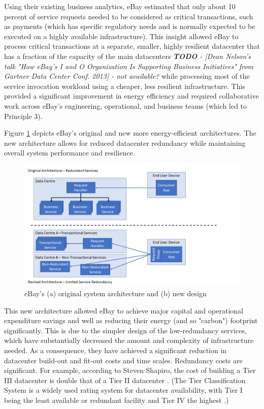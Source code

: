 Using their existing business analytics, eBay estimated that only about 10 percent of service requests needed to be considered as critical transactions, such as payments (which has specific regulatory needs and is normally expected to be executed on a highly available infrastructure). This insight allowed eBay to process critical transactions at a separate, smaller, highly resilient datacenter that has a fraction of the capacity of the main datacenters \emph{\textbf{TODO} - [Dean Nelson's talk "How eBay's I and O Organization Is Supporting Business Initiatives" from Gartner Data Center Conf. 2013] - not available?} while processing most of the service invocation workload using a cheaper, less resilient infrastructure. This provided a significant improvement in energy efficiency and required collaborative work across eBay's engineering, operational, and business teams (which led to Principle 3).

Figure \ref{figure:styles} depicts eBay's original and new more energy-efficient architectures. The new architecture allows for reduced datacenter redundancy while maintaining overall system performance and resilience.

\begin{figure}
\centering
\includegraphics[width=\textwidth]{Figures/principles-styles}
\caption{eBay's (a) original system architecture and (b) new design}
\label{figure:styles}
\end{figure}

This new architecture allowed eBay to achieve major capital and operational expenditure savings and well as reducing their energy (and so "carbon") footprint significantly. This is due to the simpler design of the low-redundancy services, which have substantially decreased the amount and complexity of infrastructure needed.  As a consequence, they have achieved a significant reduction in datacenter build-out and fit-out costs and time scales. Redundancy costs are significant. For example, according to Steven Shapiro, the cost of building a Tier III datacenter is double that of a Tier II datacenter \cite{shapiro2015-datacentre-mythsrealities}. (The Tier Classification System is a widely used rating system for datacenter availability, with Tier I being the least available or redundant facility and Tier IV the highest \cite{uptime2015-tierclassification}.)

